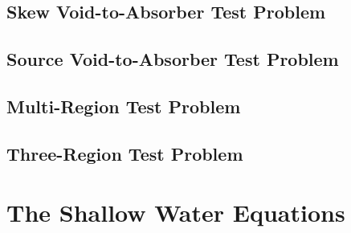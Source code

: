 \subsection{Skew Void-to-Absorber Test Problem\label{sec:skew_void_to_absorber}}
  
\subsection{Source Void-to-Absorber Test Problem\label{sec:source_void_to_absorber}}
  
\subsection{Multi-Region Test Problem\label{sec:multi_region}}
  
\subsection{Three-Region Test Problem\label{sec:three_region}}
  
\section{The Shallow Water Equations\label{sec:shallow_water_results}}
